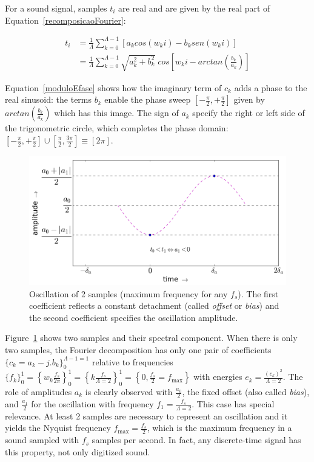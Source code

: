 For a sound signal, samples $t_i$ are real and are given by the real part of Equation~\ref{recomposicaoFourier}:

\begin{equation}\label{moduloEfase}
\begin{split}
t_i& = \frac{1}{\Lambda}\sum_{k=0}^{\Lambda-1}\left[a_k cos(w_k i) -b_k sen(w_k i)\right] \\
   & = \frac{1}{\Lambda}\sum_{k=0}^{\Lambda-1}\sqrt{a_k^2 + b_k^2} \; cos\left[w_k i - arctan\left(\frac{b_k}{a_k}\right)\right]
\end{split}
\end{equation}

Equation~\ref{moduloEfase} shows how the imaginary term of $c_k$ adds a phase to the real sinusoid: the terms $b_k$ enable the phase sweep $\left[-\frac{\pi}{2},+\frac{\pi}{2}\right]$ given by $arctan\left(\frac{b_k}{a_k}\right)$ which has this image. The sign of $a_k$ specify the right or left side of the trigonometric circle, which completes the phase domain: $\left[-\frac{\pi}{2},+\frac{\pi}{2}\right] \cup \left[\frac{\pi}{2},\frac{3\pi}{2}\right]\equiv [2\pi]$.

 \begin{figure}
     \centering
         \includegraphics[width=.7\textwidth]{figures/amostras2c___}
     \caption{Oscillation of 2 samples (maximum frequency for any $f_s$). The first coefficient reflects a constant detachment (called \emph{offset} or \emph{bias}) and the second coefficient specifies the oscillation amplitude.}
         \label{fig:amostras2}
 \end{figure}

Figure~\ref{fig:amostras2} shows two samples and their spectral component. When there is only two samples, the Fourier decomposition has only one pair of coefficients $\{c_k=a_k-j.b_k\}_0^{\Lambda-1=1}$ relative to frequencies $\{f_k\}_0^1=\left\{w_k\frac{f_s}{2\pi}\right\}_0^1=\left\{k\frac{f_s}{\Lambda=2}\right\}_0^1=\left\{0,\frac{f_s}{2}=f_{\text{max}}\right\}$
with energies $e_k=\frac{(c_k)^2}{\Lambda=2}$. The role of amplitudes $a_k$ is clearly observed with $\frac{a_0}{2}$, the fixed offset (also called \emph{bias}), and $\frac{a_1}{2}$ for the oscillation with frequency $f_1=\frac{f_s}{\Lambda=2}$.
This case has special relevance. At least 2 samples are necessary to represent an oscillation and it yields the Nyquist frequency $f_{\text{max}}=\frac{f_s}{2}$, which is the maximum frequency in a sound sampled with $f_s$ samples per second. In fact, any discrete-time signal has this property, not only digitized sound.

